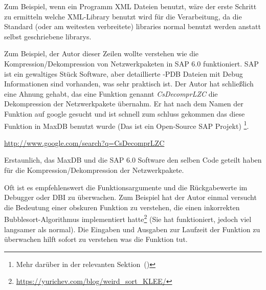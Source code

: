 Zum Beispiel, wenn ein Programm XML Dateien benutzt, w\"are der erste Schritt zu ermitteln welche
XML-Library benutzt wird f\"ur die Verarbeitung, da die Standard (oder am weitesten verbreitete) libraries
normal benutzt werden anstatt selbst geschriebene librarys.


Zum Beispiel, der Autor dieser Zeilen wollte verstehen wie die Kompression/Dekompression von Netzwerkpaketen in SAP 6.0 funktioniert.
SAP ist ein gewaltiges St\"uck Software, aber detaillierte -\gls{PDB} Dateien mit Debug Informationen sind vorhanden, was sehr praktisch 
ist. Der Autor hat schließlich eine Ahnung gehabt, das eine Funktion genannt \emph{CsDecomprLZC} die Dekompression der Netzwerkpakete \"ubernahm.
Er hat nach dem Namen der Funktion auf google gesucht und ist schnell zum schluss gekommen das diese Funktion in 
MaxDB benutzt wurde (Das ist ein Open-Source SAP Projekt) \footnote{Mehr dar\"uber in der relevanten Sektion~()}. 

\url{http://www.google.com/search?q=CsDecomprLZC}

Erstaunlich, das MaxDB und die SAP 6.0 Software den selben Code geteilt haben f\"ur die Kompression/Dekompression der Netzwerkpakete.

 

Oft ist es empfehlenswert die Funktionsargumente und die R\"uckgabewerte im
Debugger oder \ac{DBI} zu \"uberwachen. Zum Beispiel hat der Autor einmal
versucht die Bedeutung einer obskuren Funktion zu verstehen, die einen inkorrekten
Bubblesort-Algorithmus implementiert hatte\footnote{\url{https://yurichev.com/blog/weird_sort_KLEE/}}
(Sie hat funktioniert, jedoch viel langsamer als normal). Die Eingaben und Ausgaben zur Laufzeit 
der Funktion zu \"uberwachen hilft sofort zu verstehen was die Funktion tut.













